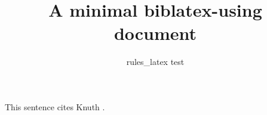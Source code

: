 \documentclass[12pt,a4paper]{article}
\title{A minimal biblatex-using document}
\author{rules\_latex test}
\date{}
\begin{document}
\maketitle

This sentence cites Knuth \cite{knuth1984}.

\printbibliography
\end{document}
